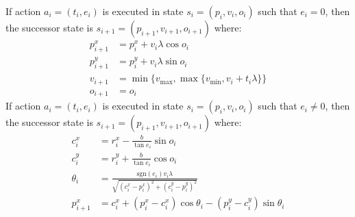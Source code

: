 \documentclass[10pt]{article}
\theoremstyle{plain}
\begin{document}
If action $a_{i} = (t_{i}, e_{i})$ is executed in state $s_{i} = (p_{i}, v_{i}, o_{i})$ such that $e_{i} = 0$, then the successor state is $s_{i+1} = (p_{i+1}, v_{i+1}, o_{i+1})$ where:
\begin{align}
    p_{i+1}^{x} & = p_{i}^{x} + v_{i} \lambda \cos{o_{i}} \\
    p_{i+1}^{y} & = p_{i}^{y} + v_{i} \lambda \sin{o_{i}} \\
    v_{i+1} & = \min\{ v_{\max}, \max\{ v_{\min}, v_{i} + t_{i} \lambda \} \} \\
    o_{i+1} & = o_{i}
\end{align}
If action $a_{i} = (t_{i}, e_{i})$ is executed in state $s_{i} = (p_{i}, v_{i}, o_{i})$ such that $e_{i} \ne 0$, then the successor state is $s_{i+1} = (p_{i+1}, v_{i+1}, o_{i+1})$ where:
\begin{align}
    c_{i}^{x} & = r_{i}^{x} - \frac{b}{\tan{e_{i}}} \sin{o_{i}} \\
    c_{i}^{y} & = r_{i}^{y} + \frac{b}{\tan{e_{i}}} \cos{o_{i}} \\
    \theta_{i} & = \frac{ \text{sgn}(e_{i}) v_{i} \lambda}{\sqrt{(c_{i}^{x} - p_{i}^{x})^{2} + (c_{i}^{y} - p_{i}^{y})^{2}}} \\
    p_{i+1}^{x} & = c_{i}^{x} + (p_{i}^{x} - c_{i}^{x}) \cos{\theta_{i}} - (p_{i}^{y} - c_{i}^{y}) \sin{\theta_{i}} \\

\end{align}
\end{document}
